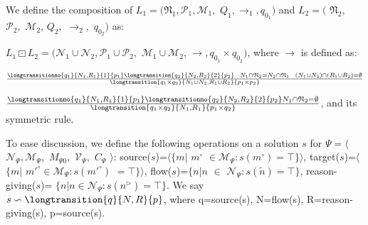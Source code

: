 \begin{definition}
\label{def:composition}
We define the composition of $L_1=($$\mathfrak{N}_1,$$\mathcal{P}_1,$$\mathcal{M}_1,$ $Q_{1},$$\rightarrow_1,$$ q_{0_1})$ and $L_2=($ $\mathfrak{N}_2,$ $\mathcal{P}_2,$ $\mathcal{M}_2$, $Q_{2},$ $\rightarrow_2,$ $q_{0_2})$ as:

$L_1\boxdot L_2=(\mathcal{N}_1\cup \mathcal{N}_2,\mathcal{P}_1\cup \mathcal{P}_2,$ $\mathcal{M}_1 \cup \mathcal{M}_2$, $\rightarrow, q_{0_1}\times q_{0_2})$, where $\rightarrow$ is defined as:

$\frac{\longtransitionno{q_1}{N_1,R_1}{1}{p_1} \longtransition{q_2}{N_2,R_2}{2}{p_2}\ \ N_1\cap \mathfrak{N}_2 = N_2\cap \mathfrak{N}_1\ \ (N_1 \cup N_2)\cap (R_1 \cup R_2)=\emptyset}{\longtransition{q_1\times q_2}{N_1 \cup N_2,R_1\cup R_2}{p_1 \times p_2}}$ 

$\frac{\longtransitionno{q_1}{N_1,R_1}{1}{p_1} \longtransitionno{q_2}{N_2,R_2}{2}{p_2}N_1 \cap \mathfrak{N}_2=\emptyset}{\longtransition{q_1\times q_2}{N_1,R_1}{p_1 \times q_2}}$, and its symmetric rule.%
\end{definition}

To ease discussion, we define the following operations on a solution $s$ for $\Psi=\langle $$\mathcal{N}_{\Psi}, $$\mathcal{M}_{\Psi},$ $M_{\Psi 0},$ $\mathcal{V}_{\Psi},$ $C_{\Psi}$ $\rangle$: 
 source($s$)=$\langle\{m|$ $m^\circ$ $\in \mathcal{M}_{\Psi}: s(m^\circ)=\top\}\rangle$, target($s$)=$\langle$$\{m|$ $m'^\circ$$ \in \mathcal{M}_{\Psi}: $$s(m'^\circ)$ $=\top\}\rangle$, flow($s$)=$\{n|n$ $\in$ $\mathcal{N}_{\Psi}: s(\tilde{n})=\top\}$, reason-giving($s$)= $\{n|n \in \mathcal{N}_{\Psi}: s(n^\triangleright)=\top\}$. We say $s \backsim \longtransition{q}{N,R}{p}$, where q=source(s), N=flow(s), R=reason-giving(s), p=source(s).

